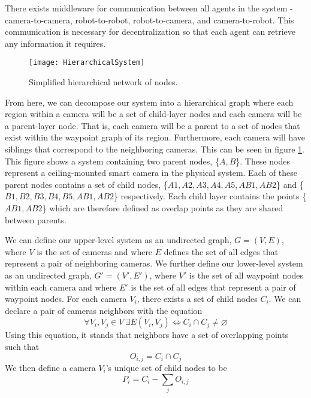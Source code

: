 There exists middleware for communication between all agents in the system - camera-to-camera, robot-to-robot, robot-to-camera, and camera-to-robot. This communication is necessary for decentralization so that each agent can retrieve any information it requires.

\begin{figure}[!t]
\centering
\texttt{[image: HierarchicalSystem]}
\caption{Simplified hierarchical network of nodes.}
\label{fig_hier}
\end{figure}

From here, we can decompose our system into a hierarchical graph where each region within a camera will be a set of child-layer nodes and each camera will be a parent-layer node. That is, each camera will be a parent to a set of nodes that exist within the waypoint graph of its region. Furthermore, each camera will have siblings that correspond to the neighboring cameras. This can be seen in figure \ref{fig_hier}. This figure shows a system containing two parent nodes, \{\(A,B\)\}. These nodes represent a ceiling-mounted smart camera in the physical system. Each of these parent nodes contains a set of child nodes, \{\(A1, A2, A3, A4, A5, AB1, AB2\)\} and \{\(B1, B2, B3, B4, B5, AB1, AB2\)\} respectively. Each child layer contains the points \{\(AB1, AB2\)\} which are therefore defined as overlap points as they are shared between parents.

We can define our upper-level system as an undirected graph, \(G = (V,E)\), where \(V\) is the set of cameras and where \(E\) defines the set of all edges that represent a pair of neighboring cameras. We further define our lower-level system as an undirected graph, \(G' = (V',E')\), where \(V'\) is the set of all waypoint nodes within each camera and where \(E'\) is the set of all edges that represent a pair of waypoint nodes. For each camera \(V_i\), there exists a set of child nodes \(C_i\).
We can declare a pair of cameras neighbors with the equation
\begin{equation}
\forall V_i, V_j \in V \ \exists E(V_i, V_j) \iff C_i \cap C_j \neq \varnothing
\end{equation}
Using this equation, it stands that neighbors have a set of overlapping points such that
\begin{equation}
O_{i,j} =  C_i \cap C_j
\end{equation} 
We then define a camera \(V_i\)'s unique set of child nodes to be 
\begin{equation}
P_i = C_i - \sum_j O_{i,j}
\end{equation}


